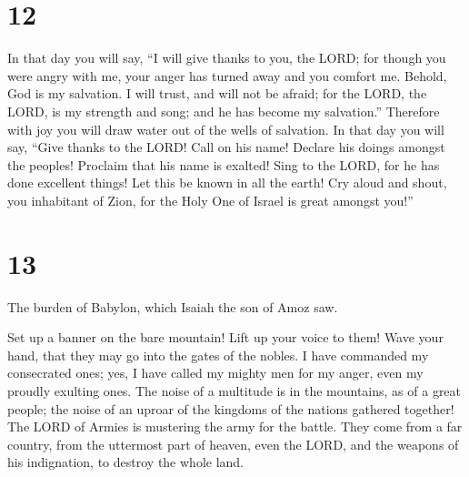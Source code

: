 \hypertarget{section-11}{%
\section{12}\label{section-11}}

 In that day you will say, ``I will give thanks to you, the
LORD; for though you were angry with me, your anger has turned away and
you comfort me.  Behold, God is my salvation. I will trust,
and will not be afraid; for the LORD, the LORD, is my strength and song;
and he has become my salvation.''  Therefore with joy you
will draw water out of the wells of salvation.  In that day
you will say, ``Give thanks to the LORD! Call on his name! Declare his
doings amongst the peoples! Proclaim that his name is exalted!
 Sing to the LORD, for he has done excellent things! Let
this be known in all the earth!  Cry aloud and shout, you
inhabitant of Zion, for the Holy One of Israel is great amongst you!''

\hypertarget{section-12}{%
\section{13}\label{section-12}}

 The burden of Babylon, which Isaiah the son of Amoz saw.

 Set up a banner on the bare mountain! Lift up your voice to
them! Wave your hand, that they may go into the gates of the nobles.
 I have commanded my consecrated ones; yes, I have called my
mighty men for my anger, even my proudly exulting ones.  The
noise of a multitude is in the mountains, as of a great people; the
noise of an uproar of the kingdoms of the nations gathered together! The
LORD of Armies is mustering the army for the battle.  They
come from a far country, from the uttermost part of heaven, even the
LORD, and the weapons of his indignation, to destroy the whole land.


